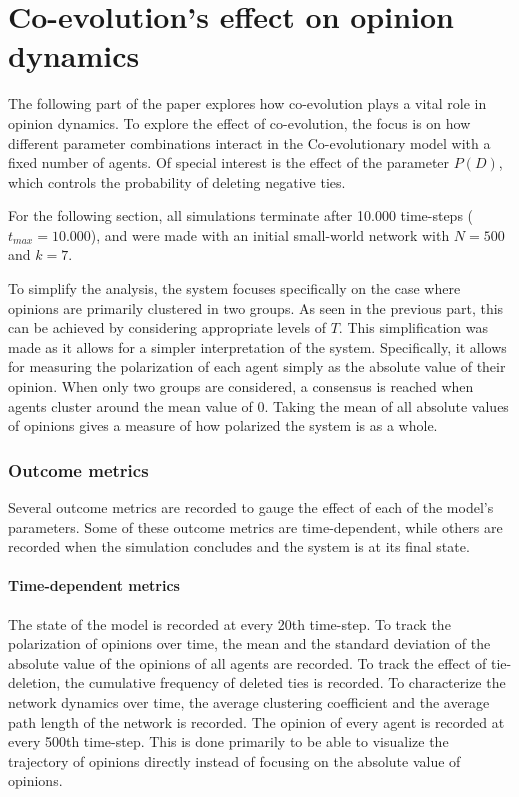 \documentclass[11pt]{article}
\begin{document}
\part{Co-evolution's effect on opinion dynamics}

The following part of the paper explores how co-evolution plays a vital role in opinion dynamics. To explore the effect of co-evolution, the focus is on how different parameter combinations interact in the Co-evolutionary model with a fixed number of agents. Of special interest is the effect of the parameter $P(D)$, which controls the probability of deleting negative ties. 

\noindent For the following section, all simulations terminate after 10.000 time-steps ($t_{max} = 10.000$), and were made with an initial small-world network with $N=500$ and $k=7$. 

\noindent To simplify the analysis, the system focuses specifically on the case where opinions are primarily clustered in two groups. As seen in the previous part, this can be achieved by considering appropriate levels of $T$. This simplification was made as it allows for a simpler interpretation of the system. Specifically, it allows for measuring the polarization of each agent simply as the absolute value of their opinion. When only two groups are considered, a consensus is reached when agents cluster around the mean value of 0. Taking the mean of all absolute values of opinions gives a measure of how polarized the system is as a whole. 

\section{Outcome metrics} 
Several outcome metrics are recorded to gauge the effect of each of the model's parameters. Some of these outcome metrics are time-dependent, while others are recorded when the simulation concludes and the system is at its final state. 

\subsection{Time-dependent metrics}
The state of the model is recorded at every 20th time-step.
To track the polarization of opinions over time, the mean and the standard deviation of the absolute value of the opinions of all agents are recorded.
To track the effect of tie-deletion, the cumulative frequency of deleted ties is recorded.
To characterize the network dynamics over time, the average clustering coefficient and the average path length of the network is recorded.
The opinion of every agent is recorded at every 500th time-step. This is done primarily to be able to visualize the trajectory of opinions directly instead of focusing on the absolute value of opinions. 
\end{document}
